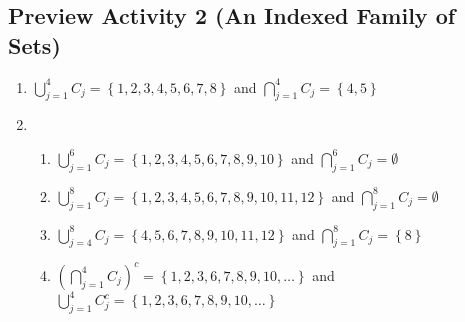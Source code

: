 \subsection*{Preview Activity 2 (An Indexed Family of Sets)}
\begin{enumerate}
\item $\bigcup\limits_{j=1}^{4}C_j = \left\{ 1, 2, 3, 4, 5, 6, 7, 8 \right\}$ \qquad and  \qquad
$\bigcap\limits_{j=1}^{4}C_j = \left\{ 4, 5 \right\}$

\item \begin{enumerate}
\item $\bigcup\limits_{j=1}^{6}C_j = \left\{ 1, 2, 3, 4, 5, 6, 7, 8, 9, 10 \right\}$ and  
$\bigcap\limits_{j=1}^{6}C_j = \emptyset$

\item $\bigcup\limits_{j=1}^{8}C_j = \left\{ 1, 2, 3, 4, 5, 6, 7, 8, 9, 10, 11, 12 \right\}$ and  $\bigcap\limits_{j=1}^{8}C_j = \emptyset$

\item $\bigcup\limits_{j=4}^{8}C_j = \left\{ 4, 5, 6, 7, 8, 9, 10, 11, 12 \right\}$ and  
$\bigcap\limits_{j=1}^{8}C_j = \left\{ 8 \right\}$


\item $( \bigcap\limits_{j=1}^{4}C_j )^c = \left\{1, 2, 3, 6, 7, 8, 9, 10, \ldots \right\}$ and \\
$\bigcup\limits_{j=1}^{4}C_j^c = \left\{1, 2, 3, 6, 7, 8, 9, 10, \ldots \right\}$

\end{enumerate}
\end{enumerate}
\hbreak



\newpage

\endinput
